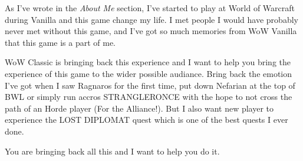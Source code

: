 
As I've wrote in the \emph{About Me} section, I've started to play at World of Warcraft during Vanilla and this game change my life. I met people I would have probably never met without this game, and I've got so much memories from WoW Vanilla that this game is a part of me.

WoW Classic is bringing back this experience and I want to help you bring the experience of this game to the wider possible audiance. Bring back the emotion I've got when I saw Ragnaros for the first time, put down Nefarian at the top of BWL or simply run accros STRANGLERONCE with the hope to not cross the path of an Horde player (For the Alliance!). But I also want new player to experience the LOST DIPLOMAT quest which is one of the best quests I ever done.

You are bringing back all this and I want to help you do it.